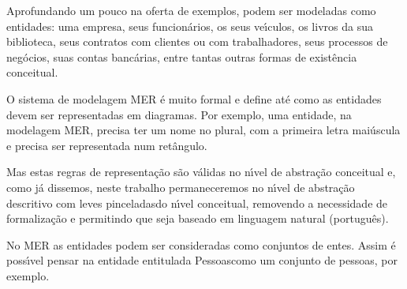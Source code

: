 \documentclass[
12pt,		%
openright,	%
twoside,  %
a4paper,			%
chapter=TITLE,		%
english,			%
french,				%
spanish,			%
brazil				%
]{USPSC-classe/USPSC}
\begin{document}
Aprofundando um pouco na oferta de exemplos, podem ser modeladas como entidades: uma empresa, seus funcion\'arios, os seus ve\'{\i}culos, os livros da sua biblioteca, seus contratos com clientes ou com trabalhadores, seus processos de neg\'ocios, suas contas banc\'arias, entre tantas outras formas de exist\^encia conceitual.














O sistema de modelagem MER \'e muito formal e define at\'e como as entidades devem ser representadas em diagramas. Por exemplo, uma entidade, na modelagem MER, precisa ter um nome no plural, com a primeira letra mai\'uscula e precisa ser representada num ret\^angulo.














Mas estas regras de representa\c{c}\~ao s\~ao v\'alidas no n\'{\i}vel de abstra\c{c}\~ao conceitual e, como j\'a dissemos, neste trabalho permaneceremos no n\'{\i}vel de abstra\c{c}\~ao descritivo com \textquotedbl leves pinceladas\textquotedbl  do n\'{\i}vel conceitual, removendo a necessidade de formaliza\c{c}\~ao e permitindo que seja baseado em linguagem natural (portugu\^es).














No MER as entidades podem ser consideradas como conjuntos de entes. Assim \'e poss\'{\i}vel pensar na entidade entitulada \textquotedbl Pessoas\textquotedbl  como um conjunto de pessoas, por exemplo.
\end{document}
